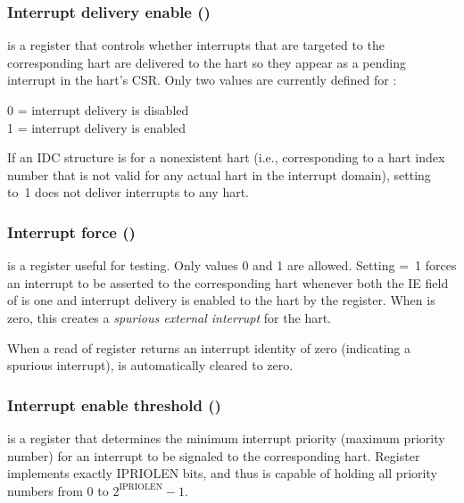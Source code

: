 \subsubsection{Interrupt delivery enable ()}

 is a {\WARL} register that controls whether interrupts
that are targeted to the corresponding hart are delivered to the hart
so they appear as a pending interrupt in the hart's  CSR.
Only two values are currently defined for :
\begin{displayLinesTable}
0 = interrupt delivery is disabled \\
1 = interrupt delivery is enabled \\
\end{displayLinesTable}

If an IDC structure is for a nonexistent hart (i.e., corresponding
to a hart index number that is not valid for any actual hart in
the interrupt domain), setting  to~1 does not deliver
interrupts to any hart.

\subsubsection{Interrupt force ()}

 is a {\WARL} register useful for testing.
Only values 0 and 1 are allowed.
Setting  =~1 forces an interrupt to be asserted to the
corresponding hart whenever both the IE field of  is one
and interrupt delivery is enabled to the hart by the 
register.
When  is zero, this creates a \emph{spurious external
interrupt} for the hart.

When a read of register  returns an interrupt identity of
zero (indicating a spurious interrupt),  is automatically
cleared to zero.

\subsubsection{Interrupt enable threshold ()}

 is a {\WLRL} register that determines the minimum
interrupt priority (maximum priority number) for an interrupt to be
signaled to the corresponding hart.
Register  implements exactly IPRIOLEN bits,
and thus is capable of holding all priority numbers from 0 to
${\mbox{2}^{\textrm{IPRIOLEN}} - \mbox{1}}$.


